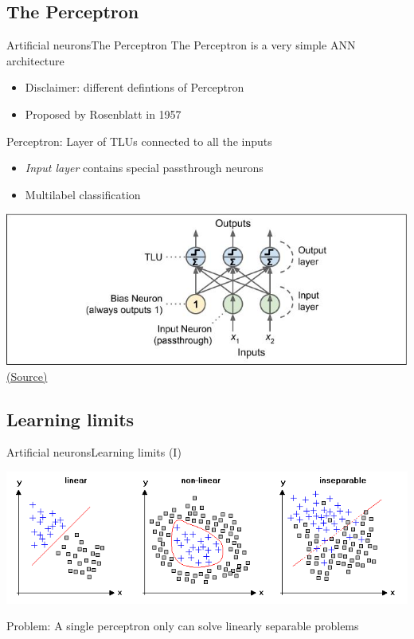 \documentclass[10pt,compress]{beamer} %
\begin{document}
\subsection{The Perceptron}
\begin{frame}{Artificial neurons}{The Perceptron}
	The Perceptron is a very simple ANN architecture
	\begin{itemize}
	\item Disclaimer: different defintions of Perceptron
	\item Proposed by Rosenblatt in 1957
	\end{itemize}

	Perceptron: Layer of TLUs connected to all the inputs
	\begin{itemize}
	\item \textit{Input layer} contains special passthrough neurons
	\item Multilabel classification
	\end{itemize}

	\begin{center}
	\includegraphics[width=0.9\linewidth]{figs/perceptron.jpg}\\
	\centering \tiny{\href{https://hackmd.io/@imkushwaha/perceptron}{(Source)}}
	\end{center}
\end{frame}

\subsection{Learning limits}
\begin{frame}{Artificial neurons}{Learning limits (I)}
	\begin{center}
	\includegraphics[width=0.9\linewidth]{figs/linear2.png}
	\end{center}
	Problem: A single perceptron only can solve linearly separable problems
\end{frame}
\end{document}
